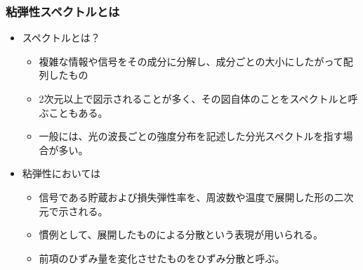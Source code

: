 \documentclass[12pt, dvipdfmx]{beamer}
\begin{document}
\begin{frame}
	\frametitle{粘弾性スペクトルとは}
	\begin{itemize}
		\item スペクトルとは？
		\begin{itemize}
			\item 複雑な情報や信号をその成分に分解し、成分ごとの大小にしたがって配列したもの
			\item 2次元以上で図示されることが多く、その図自体のことをスペクトルと呼ぶこともある。
			\item 一般には、光の波長ごとの強度分布を記述した分光スペクトルを指す場合が多い。
		\end{itemize}
		\item 粘弾性においては
		\begin{itemize}
			\item 信号である貯蔵および損失弾性率を、周波数や温度で展開した形の二次元で示される。
			\item 慣例として、展開したものによる分散という表現が用いられる。
			\item 前項のひずみ量を変化させたものをひずみ分散と呼ぶ。
		\end{itemize}
	\end{itemize}
\end{frame}
\end{document}
